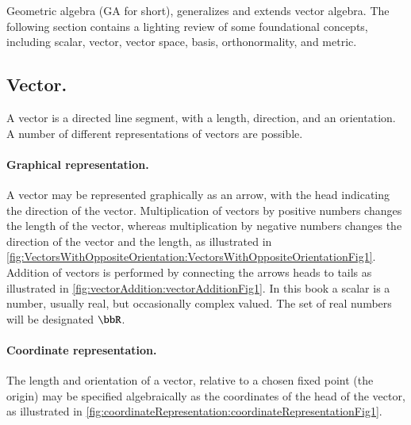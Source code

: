 %
%
Geometric algebra (GA for short), generalizes and extends vector algebra.
The following section contains a lighting review of some
foundational concepts, including
scalar, vector, vector space, basis, orthonormality, and metric.

\subsection{Vector.}

A vector is a directed line segment, with a length, direction, and an orientation.  A number of different representations of vectors are possible.

\paragraph{Graphical representation.}

A vector may be represented graphically as an arrow, with the head indicating the direction of the vector.
Multiplication of vectors by positive numbers changes the length of the vector, whereas multiplication by negative numbers changes the direction of the vector and the length, as illustrated in
\cref{fig:VectorsWithOppositeOrientation:VectorsWithOppositeOrientationFig1}.
Addition of vectors is performed by connecting the arrows heads to tails as illustrated in
\cref{fig:vectorAddition:vectorAdditionFig1}.
\index{\(\bbR\)}
In this book a scalar is a number, usually real, but occasionally complex valued.  The set of real numbers will be designated \(\bbR\).

\paragraph{Coordinate representation.}

The length and orientation of a vector, relative to a chosen fixed point (the origin) may be specified algebraically as the coordinates of the head of the vector, as
illustrated in \cref{fig:coordinateRepresentation:coordinateRepresentationFig1}.

